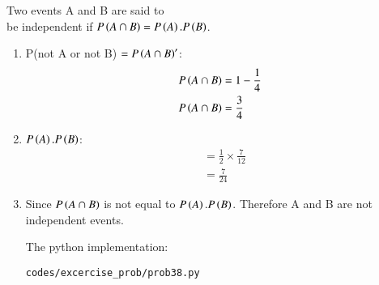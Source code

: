 \renewcommand{\theequation}{\theenumi}

\begin{theorem}
Two events A and B are said to \\
be independent if $P\left(A \cap B\right) = P\left(A\right).P\left(B\right)$.
\end{theorem}


\begin{enumerate}

\item P(not A or not B) $=P\left(A \cap B\right)'$:
\begin{align*}
P\left(A \cap B\right) &= 1 - \frac{1}{4}\\
P\left(A \cap B\right) &= \frac{3}{4}\\
\end{align*}

\item $P\left(A\right).P\left(B\right)$:
\begin{align*}
&=\frac{1}{2} \times \frac{7}{12}\\
&= \frac{7}{24}
\end{align*}

\item Since $P\left(A \cap B\right)$ is not equal to $P\left(A\right).P\left(B\right)$. Therefore A and B are not independent events.

The python implementation:
\begin{lstlisting}
codes/excercise_prob/prob38.py
\end{lstlisting}


\end{enumerate}
